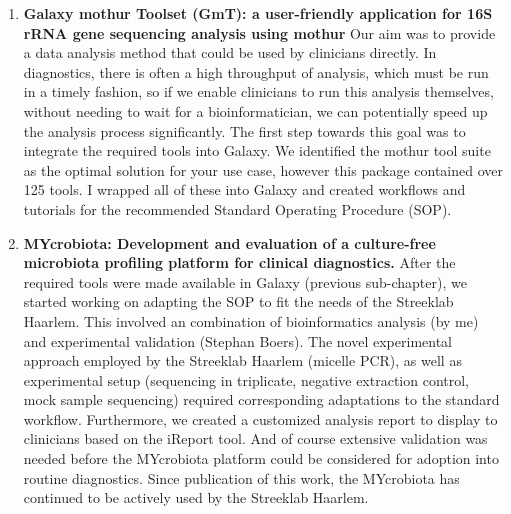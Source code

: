 \begin{enumerate}[label=\ref{chapter:microbiota}.\arabic*]
\itemsep-0.5em
\setcounter{enumi}{-1}
\item \textbf{Galaxy mothur Toolset (GmT): a user-friendly application for 16S rRNA gene sequencing analysis using mothur}
Our aim was to provide a data analysis method that could be used by clinicians directly. In diagnostics, there is often a high throughput of analysis, which must be run in a timely fashion, so if we enable clinicians to run this analysis themselves, without needing to wait for a bioinformatician, we can potentially speed up the analysis process significantly. The first step towards this goal was to integrate the required tools into Galaxy. We identified the mothur tool suite as the optimal solution for your use case, however this package contained over 125 tools. I wrapped all of these into Galaxy and created workflows and tutorials for the recommended Standard Operating Procedure (SOP).

\item \textbf{MYcrobiota: Development and evaluation of a culture-free microbiota profiling platform for clinical diagnostics.} After the required tools were made available in Galaxy (previous sub-chapter), we started working on adapting the SOP to fit the needs of the Streeklab Haarlem. This involved an combination of bioinformatics analysis (by me) and experimental validation (Stephan Boers). The novel experimental approach employed by the Streeklab Haarlem (micelle PCR), as well as experimental setup (sequencing in triplicate, negative extraction control, mock sample sequencing) required corresponding adaptations to the standard workflow. Furthermore, we created a customized analysis report to display to clinicians based on the iReport tool. And of course extensive validation was needed before the MYcrobiota platform could be considered for adoption into routine diagnostics. Since publication of this work, the MYcrobiota has continued to be actively used by the Streeklab Haarlem.

\end{enumerate}


